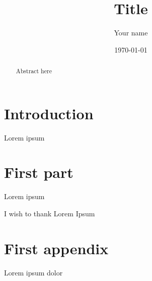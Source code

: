 \documentclass[
 reprint,
 superscriptaddress,
 preprintnumbers,
 amsmath,amssymb,
 aps,pra,
 onecolumn
]{revtex4-2}
\begin{document}

\title{Title}

\author{Your name}

\date{\today}

\begin{abstract}
    Abstract here
\end{abstract}

\maketitle

\section*{Introduction}

Lorem ipsum

\section{First part}

Lorem ipsum

\begin{acknowledgments}
    I wish to thank Lorem Ipsum
\end{acknowledgments}


\appendix


\section{First appendix}

Lorem ipsum dolor


\nocite{*}

\end{document}
